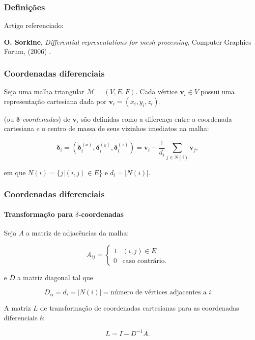\begin{frame}
\frametitle{Definições}
	
Artigo referenciado:

\medskip

\textbf{O. Sorkine}, \textit{Differential representations for mesh processing}, Computer Graphics Forum, (2006) \cite{sorkine2006}.
	
\end{frame}

\begin{frame}
\frametitle{Coordenadas diferenciais}

Seja uma malha triangular $\mathcal{M} = (V, E, F)$. Cada vértice $\mathbf{v}_i \in V$ possui uma representação cartesiana dada por $\mathbf{v}_i = (x_i,y_i,z_i)$.

\medskip

 (ou $\mathbf{\delta}$\textit{-coordenadas}) de $\mathbf{v}_i$ são definidas como a diferença entre a coordenada cartesiana e o centro de massa de seus vizinhos imediatos na malha:

\begin{equation}
\mathbf{\delta}_i = (\mathbf{\delta}_i^{(x)}, \mathbf{\delta}_i^{(y)}, \mathbf{\delta}_i^{(z)}) = \mathbf{v}_i - \frac{1}{d_i} \sum_{j \in N(i)} \mathbf{v}_j,
\label{eq_delta}
\end{equation}

\noindent em que $N(i) = \{j|(i,j) \in E$\} e $d_i = |N(i)|$.
	
\end{frame}




\begin{frame}
\frametitle{Coordenadas diferenciais}
\framesubtitle{Transformação para $\delta$-coordenadas}

Seja $A$ a matriz de adjacências da malha:

$$
A_{ij} = \begin{cases}
1&(i, j) \in E\\
0&\text{caso contrário.}
\end{cases}
$$

e $D$ a matriz diagonal tal que

$$D_{ii} = d_{i} = |N(i)| = \text{número de vértices adjacentes a }i$$

A matriz $L$ de transformação de coordenadas cartesianas para as coordenadas diferenciais é:

\begin{equation}
L = I - D^{-1}A.
\end{equation}
	
\end{frame}

